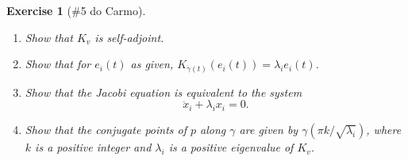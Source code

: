 \documentclass{article}
\theoremstyle{plain}
\newtheorem*{ex}{Exercise}
\theoremstyle{nonumberplain}
\begin{document}
\begin{ex}[\#5 do Carmo]
\leavevmode
\begin{enumerate}
\item Show that $K_v$ is self-adjoint.
\item Show that for $e_i(t)$ as given, $K_{\dot\gamma(t)} (e_i(t)) = \lambda_i e_i(t)$.
\item Show that the Jacobi equation is equivalent to the system
\begin{equation}
\ddot x_i + \lambda_i x_i = 0.
\end{equation}
\item Show that the conjugate points of $p$ along $\gamma$ are given by $\gamma(\pi k/\sqrt{\lambda_i})$, where $k$ is a positive integer and $\lambda_i$ is a positive eigenvalue of $K_v$.
\end{enumerate}
\end{ex}
\end{document}
